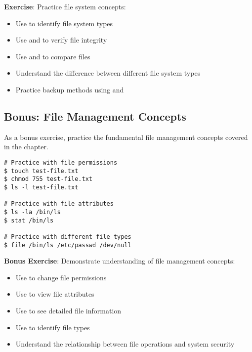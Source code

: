 \textbf{Exercise}: Practice file system concepts:
\begin{itemize}
    \item Use  to identify file system types
    \item Use  and  to verify file integrity
    \item Use  and  to compare files
    \item Understand the difference between different file system types
    \item Practice backup methods using  and 
\end{itemize}

\subsection{Bonus: File Management Concepts}

As a bonus exercise, practice the fundamental file management concepts covered in the chapter.

\begin{lstlisting}[style=bashstyle]
# Practice with file permissions
$ touch test-file.txt
$ chmod 755 test-file.txt
$ ls -l test-file.txt

# Practice with file attributes
$ ls -la /bin/ls
$ stat /bin/ls

# Practice with different file types
$ file /bin/ls /etc/passwd /dev/null
\end{lstlisting}

\textbf{Bonus Exercise}: Demonstrate understanding of file management concepts:
\begin{itemize}
    \item Use  to change file permissions
    \item Use  to view file attributes
    \item Use  to see detailed file information
    \item Use  to identify file types
    \item Understand the relationship between file operations and system security
\end{itemize}
